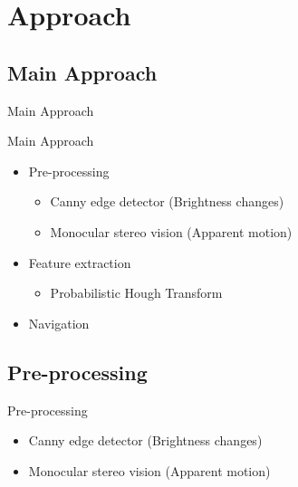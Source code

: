 \documentclass{beamer}
\begin{document}
\section{Approach}
\subsection{Main Approach}
\begin{frame}
\begin{block}{Main Approach}
\end{block}
\end{frame}

\begin{frame}
\begin{block}{Main Approach}
\begin{itemize}
\item Pre-processing 
\begin{itemize}
\item Canny edge detector (Brightness changes)
\item Monocular stereo vision (Apparent motion)
\end{itemize}
\item Feature extraction
\begin{itemize}
\item Probabilistic Hough Transform
\end{itemize}
\item Navigation
\end{itemize}
\end{block}
\end{frame}

\subsection{Pre-processing}
\begin{frame}
\begin{block}{Pre-processing}
\begin{itemize}
\item Canny edge detector (Brightness changes)
\item Monocular stereo vision (Apparent motion)
\end{itemize}
\end{block}
\end{frame}
\end{document}
